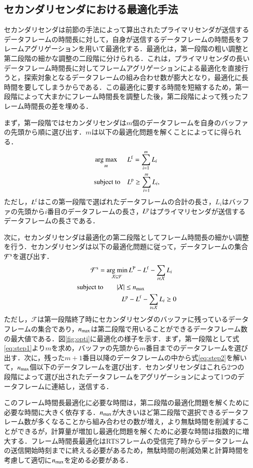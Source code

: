 \documentclass[technicalreport]{ieicej}
\newcommand{\argmax}{\mathop{\rm arg~max}\limits}
\newcommand{\argmin}{\mathop{\rm arg~min}\limits}
\begin{document}
	\subsection{セカンダリセンダにおける最適化手法}
	セカンダリセンダは前節の手法によって算出されたプライマリセンダが送信するデータフレームの時間長に対して，自身が送信するデータフレームの時間長をフレームアグリゲーションを用いて最適化する．最適化は，第一段階の粗い調整と第二段階の細かな調整の二段階に分けられる．これは，プライマリセンダの長いデータフレーム時間長に対してフレームアグリゲーションによる最適化を直接行うと，探索対象となるデータフレームの組み合わせ数が膨大となり，最適化に長時間を要してしまうからである．この最適化に要する時間を短縮するため，第一段階によって大まかにフレーム時間長を調整した後，第二段階によって残ったフレーム時間長の差を埋める．
	\par
	まず，第一段階ではセカンダリセンダは$m$個のデータフレームを自身のバッファの先頭から順に選び出す．$m$は以下の最適化問題を解くことによってに得られる．
	\begin{align}
		&\argmax_m &&L^{\rm f} = \sum_{i = 1}^{m} L_i \label{eq:step1}\\
		&{\rm subject \ to} &&L^{\rm p} \geq \sum_{i = 1}^{m} L_i,
	\end{align}
	ただし，$L^{\rm f}$はこの第一段階で選ばれたデータフレームの合計の長さ，$L_i$はバッファの先頭から$i$番目のデータフレームの長さ，$L^{\rm p}$はプライマリセンダが送信するデータフレームの長さである．
	\par
	次に，セカンダリセンダは最適化の第二段階としてフレーム時間長の細かい調整を行う．セカンダリセンダは以下の最適化問題に従って，データフレームの集合${\mathcal F}^{\rm s}$を選び出す．
	\begin{align}
		&\qquad{\mathcal F}^{\rm s} = \argmin_{{\mathcal X}\subseteq{\mathcal F}} L^{\rm P}-L^{\rm f}-\sum_{i\in{\mathcal X}}L_i \label{eq:step2}\\
		&{\rm subject\ to} \qquad|{\mathcal X}|\leq n_{\rm max}\\
		&\qquad\qquad\qquad\;\; L^{\rm p}-L^{\rm f}-\sum_{i\in{\mathcal X}}L_i\geq 0
	\end{align}
	ただし，${\mathcal F}$は第一段階終了時にセカンダリセンダのバッファに残っているデータフレームの集合であり，$n_{\rm max}$は第二段階で用いることができるデータフレーム数の最大値である．図\ref{fig:opti}に最適化の様子を示す．まず，第一段階として式\eqref{eq:step1}より$m$を求め，バッファの先頭から$m$番目までのデータフレームを選び出す．次に，残った$m+1$番目以降のデータフレームの中から式\eqref{eq:step2}を解いて，$n_{\rm max}$個以下のデータフレームを選び出す．セカンダリセンダはこれら2つの段階によって選び出されたデータフレームをアグリゲーションによって1つのデータフレームに連結し，送信する．
	\par
	このフレーム時間長最適化に必要な時間は，第二段階の最適化問題を解くために必要な時間に大きく依存する．$n_{\rm max}$が大きいほど第二段階で選択できるデータフレーム数が多くなることから組み合わせの数が増え，より無駄時間を削減することができるが，計算量が増加し最適化問題を解くために必要な時間は指数的に増大する．フレーム時間長最適化はRTSフレームの受信完了時からデータフレームの送信開始時刻までに終える必要があるため，無駄時間の削減効果と計算時間を考慮して適切に$n_{\rm max}$を定める必要がある．
\end{document}
